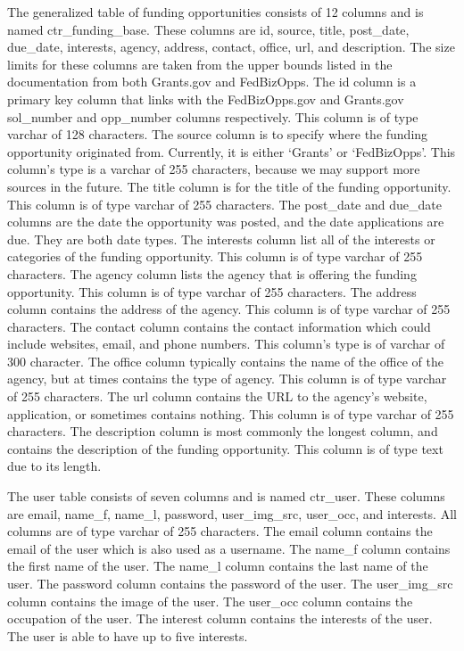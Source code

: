 \documentclass[onecolumn]{IEEEtran}
\begin{document}
The generalized table of funding opportunities consists of 12 columns and is named ctr\_funding\_base. These columns are id, source, title, post\_date, due\_date, interests, agency, address, contact, office, url, and description. The size limits for these columns are taken from the upper bounds listed in the documentation from both Grants.gov and FedBizOpps. The id column is a primary key column that links with the FedBizOpps.gov and Grants.gov sol\_number and opp\_number columns respectively. This column is of type varchar of 128 characters. The source column is to specify where the funding opportunity originated from. Currently, it is either `Grants' or `FedBizOpps'. This column's type is a varchar of 255 characters, because we may support more sources in the future. The title column is for the title of the funding opportunity. This column is of type varchar of 255 characters. The post\_date and due\_date columns are the date the opportunity was posted, and the date applications are due. They are both date types. The interests column list all of the interests or categories of the funding opportunity. This column is of type varchar of 255 characters. The agency column lists the agency that is offering the funding opportunity. This column is of type varchar of 255 characters. The address column contains the address of the agency. This column is of type varchar of 255 characters. The contact column contains the contact information which could include websites, email, and phone numbers. This column's type is of varchar of 300 character. The office column typically contains the name of the office of the agency, but at times contains the type of agency. This column is of type varchar of 255 characters. The url column contains the URL to the agency's website, application, or sometimes contains nothing. This column is of type varchar of 255 characters. The description column is most commonly the longest column, and contains the description of the funding opportunity. This column is of type text due to its length.
 
The user table consists of seven columns and is named ctr\_user. These columns are email, name\_f, name\_l, password, user\_img\_src, user\_occ, and interests. All columns are of type varchar of 255 characters. The email column contains the email of the user which is also used as a username. The name\_f column contains the first name of the user. The name\_l column contains the last name of the user. The password column contains the password of the user. The user\_img\_src column contains the image of the user. The user\_occ column contains the occupation of the user. The interest column contains the interests of the user. The user is able to have up to five interests. 
 
\end{document}
